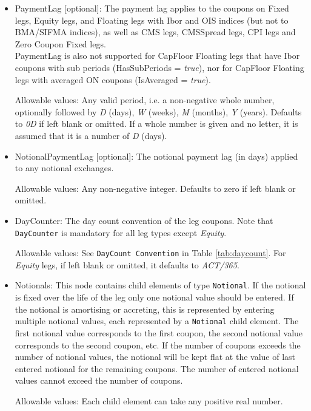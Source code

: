 \begin{itemize}
\item PaymentLag [optional]: The payment lag applies to the coupons on Fixed legs, Equity legs, and Floating legs with Ibor and OIS indices (but not to BMA/SIFMA indices), as well as CMS legs, CMSSpread legs, CPI legs and Zero Coupon Fixed legs. \\
PaymentLag is also not supported for CapFloor Floating legs that have Ibor coupons with sub periods (HasSubPeriods = \emph{true}), nor for CapFloor Floating legs with averaged ON coupons (IsAveraged = \emph{true}).

Allowable values: Any valid period, i.e. a non-negative whole number, optionally followed by \emph{D} (days), \emph{W} (weeks), \emph{M} (months),
  \emph{Y} (years). Defaults to \emph{0D} if left blank or omitted. If a whole number is given and no letter, it is assumed that it is a number of  \emph{D} (days).

\item NotionalPaymentLag [optional]: The notional payment lag (in days) applied to any notional exchanges.

Allowable values: Any non-negative integer. Defaults to zero if left blank or omitted.

\item DayCounter: The day count convention of the leg coupons. Note that \lstinline!DayCounter! is mandatory for all leg types except \emph{Equity}.

Allowable values: See \lstinline!DayCount Convention! in Table \ref{tab:daycount}. For \emph{Equity} legs, if left blank or omitted, it defaults to \emph{ACT/365}.

\item Notionals: This node contains child elements of type
  \lstinline!Notional!. If the notional is fixed over the life of the
  leg only one notional value should be entered. If the notional is
  amortising or accreting, this is represented by entering multiple
  notional values, each represented by a \lstinline!Notional! child
  element. The first notional value corresponds to the first coupon,
  the second notional value corresponds to the second coupon, etc. If
  the number of coupons exceeds the number of notional values, the
  notional will be kept flat at the value of last entered notional for
  the remaining coupons.  The number of entered notional values cannot
  exceed the number of coupons.

Allowable values: Each child element can take any positive real number.

\vspace{1em}


\end{itemize}
